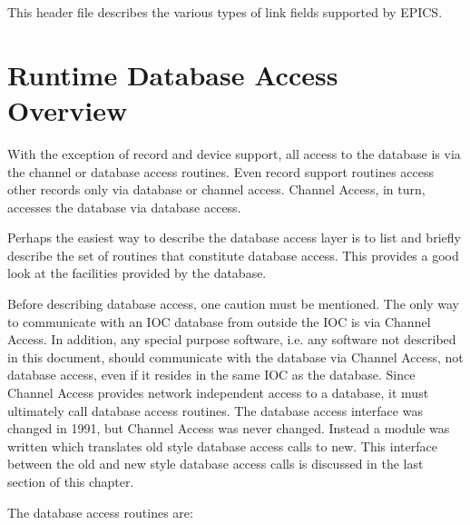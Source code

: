 This header file describes the various types of link fields supported by EPICS. 

\section{Runtime Database Access Overview}

With the exception of record and device support, all access to the database is via the  channel or database access routines. 
Even record support routines access other records only via database or channel access. Channel Access, in turn, accesses 
the database via database access.

Perhaps the easiest way to describe the database access layer is to list and briefly describe the set of routines that 
constitute database access. This provides a good look at the facilities provided by the database.

Before describing database access, one caution must be mentioned. The only way to communicate with an IOC database 
from outside the IOC is via Channel Access. In addition, any special purpose software, i.e. any software not described in 
this document, should communicate with the database via Channel Access, not database access, even if it resides in the 
same IOC as the database. Since Channel Access provides network independent access to a database, it must ultimately 
call database access routines. The database access interface was changed in 1991, but Channel Access was never changed. 
Instead a module was written which translates old style database access calls to new. This interface between the old and 
new style database access calls is discussed in the last section of this chapter.

The database access routines are:

